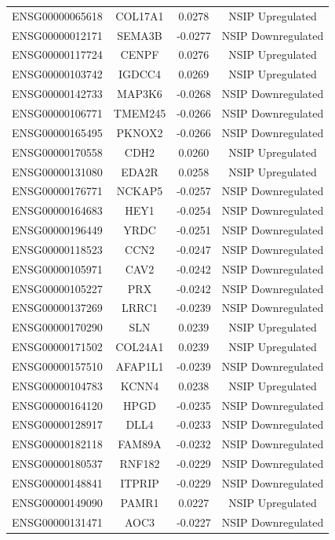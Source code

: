 \documentclass[
]{article}
\begin{document}
\begin{singlespace}
\begin{longtable}[t]{lccc}
ENSG00000065618 & COL17A1 & 0.0278 & NSIP Upregulated\\
ENSG00000012171 & SEMA3B & -0.0277 & NSIP Downregulated\\
ENSG00000117724 & CENPF & 0.0276 & NSIP Upregulated\\
\addlinespace
ENSG00000103742 & IGDCC4 & 0.0269 & NSIP Upregulated\\
ENSG00000142733 & MAP3K6 & -0.0268 & NSIP Downregulated\\
ENSG00000106771 & TMEM245 & -0.0266 & NSIP Downregulated\\
ENSG00000165495 & PKNOX2 & -0.0266 & NSIP Downregulated\\
ENSG00000170558 & CDH2 & 0.0260 & NSIP Upregulated\\
\addlinespace
ENSG00000131080 & EDA2R & 0.0258 & NSIP Upregulated\\
ENSG00000176771 & NCKAP5 & -0.0257 & NSIP Downregulated\\
ENSG00000164683 & HEY1 & -0.0254 & NSIP Downregulated\\
ENSG00000196449 & YRDC & -0.0251 & NSIP Downregulated\\
ENSG00000118523 & CCN2 & -0.0247 & NSIP Downregulated\\
\addlinespace
ENSG00000105971 & CAV2 & -0.0242 & NSIP Downregulated\\
ENSG00000105227 & PRX & -0.0242 & NSIP Downregulated\\
ENSG00000137269 & LRRC1 & -0.0239 & NSIP Downregulated\\
ENSG00000170290 & SLN & 0.0239 & NSIP Upregulated\\
ENSG00000171502 & COL24A1 & 0.0239 & NSIP Upregulated\\
\addlinespace
ENSG00000157510 & AFAP1L1 & -0.0239 & NSIP Downregulated\\
ENSG00000104783 & KCNN4 & 0.0238 & NSIP Upregulated\\
ENSG00000164120 & HPGD & -0.0235 & NSIP Downregulated\\
ENSG00000128917 & DLL4 & -0.0233 & NSIP Downregulated\\
ENSG00000182118 & FAM89A & -0.0232 & NSIP Downregulated\\
\addlinespace
ENSG00000180537 & RNF182 & -0.0229 & NSIP Downregulated\\
ENSG00000148841 & ITPRIP & -0.0229 & NSIP Downregulated\\
ENSG00000149090 & PAMR1 & 0.0227 & NSIP Upregulated\\
ENSG00000131471 & AOC3 & -0.0227 & NSIP Downregulated\\

\end{longtable}
\end{singlespace}
\end{document}
